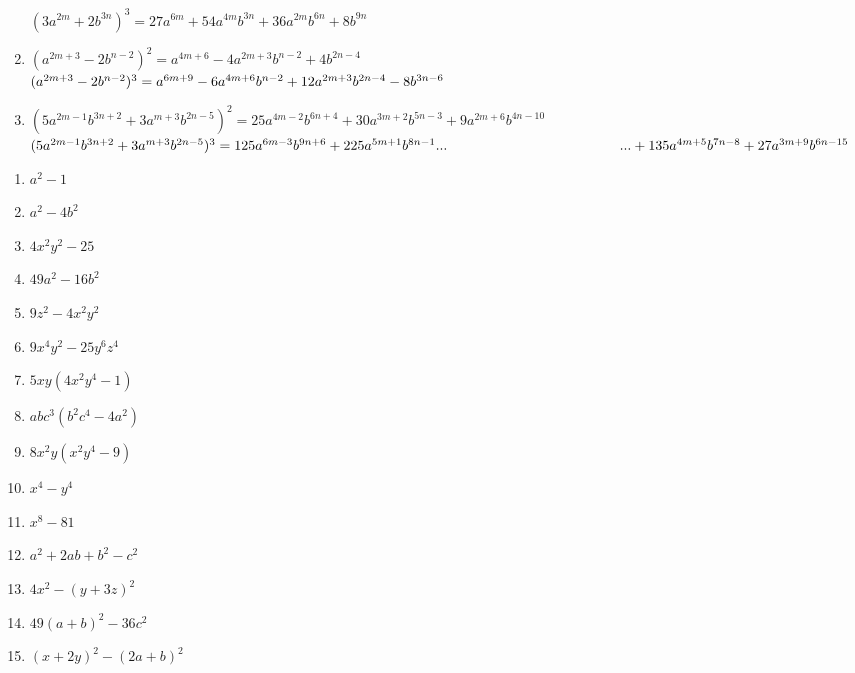 \begin{solution}
\begin{enumerate}
$(3{{a}^{2m}}+2{{b}^{3n}})^3=27{{a}^{6m}}+54{{a}^{4m}}{{b}^{3n}}+36{{a}^{2m}}{{b}^{6n}}+8{{b}^{9n}}$
\item $({{a}^{2m+3}}-2{{b}^{n-2}})^2={{a}^{4m+6}}-4{{a}^{2m+3}}{{b}^{n-2}}+4{{b}^{2n-4}}$\\
$({{a}^{2m+3}}-2{{b}^{n-2}})^3={{a}^{6m+9}}-6{{a}^{4m+6}}{{b}^{n-2}}+12{{a}^{2m+3}}{{b}^{2n-4}}\\ 
-8{{b}^{3n-6}}$
\item $(5{{a}^{2m-1}}{{b}^{3n+2}}+3{{a}^{m+3}}{{b}^{2n-5}})^2=25{{a}^{4m-2}}{{b}^{6n+4}}+30{{a}^{3m+2}}{{b}^{5n-3}}
+9{{a}^{2m+6}}{{b}^{4n-10}}$\\
$(5{{a}^{2m-1}}{{b}^{3n+2}}+3{{a}^{m+3}}{{b}^{2n-5}})^3 =125{{a}^{6m-3}}{{b}^{9n+6}}+225{{a}^{5m+1}}{{b}^{8n-1}}\mbox{...}\\ \mbox{\hspace{12em} ...}+135{{a}^{4m+5}}{{b}^{7n-8}}+27{{a}^{3m+9}}{{b}^{6n-15}}$
\end{enumerate}
\end{solution}

\begin{solution} \hfill \vspace{-0.8cm}
\begin{multicols}{3}
\begin{enumerate}
\item ${{a}^{2}}-1$	
\item ${{a}^{2}}-4{{b}^{2}}$	
\item $4{{x}^{2}}{{y}^{2}}-25$	
\item $49{{a}^{2}}-16{{b}^{2}}$	
\item $9{{z}^{2}}-4{{x}^{2}}{{y}^{2}}$	
\item $9{{x}^{4}}{{y}^{2}}-25{{y}^{6}}{{z}^{4}}$	
\item $5xy(4{{x}^{2}}{{y}^{4}}-1)$	
\item $ab{{c}^{3}}({{b}^{2}}{{c}^{4}}-4{{a}^{2}})$	
\item $8{{x}^{2}}y({{x}^{2}}{{y}^{4}}-9)$	
\item ${{x}^{4}}-{{y}^{4}}$	
\item ${{x}^{8}}-81$
\item ${{a}^{2}}+2ab+{{b}^{2}}-{{c}^{2}}$
\item $4{{x}^{2}}-{{(y+3z)}^{2}}$
\item $49{{(a+b)}^{2}}-36{{c}^{2}}$
\item ${{\left( x+2y \right)}^{2}}-{{\left( 2a+b \right)}^{2}}$
\end{enumerate}
\end{multicols}
\end{solution}

